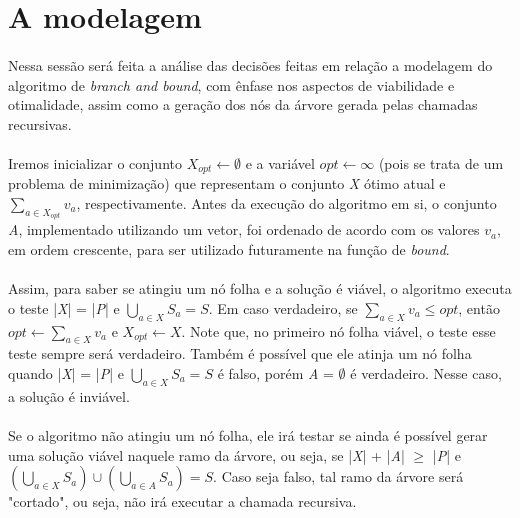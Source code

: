 \documentclass{article}
\begin{document}
\section{A modelagem}

\paragraph{} Nessa sessão será feita a análise das decisões feitas em relação a modelagem do algoritmo de \emph{branch and bound}, com ênfase nos aspectos de viabilidade e otimalidade, assim como a geração dos nós da árvore gerada pelas chamadas recursivas.

\paragraph{} Iremos inicializar o conjunto \emph{$X_{opt} \leftarrow \emptyset$} e a variável \emph{$opt \leftarrow \infty$} (pois se trata de um problema de minimização) que representam o conjunto \emph{X} ótimo atual e \emph{$\sum_{a \in X_{opt}} v_a$}, respectivamente. Antes da execução do algoritmo em si, o conjunto \emph{A}, implementado utilizando um vetor, foi ordenado de acordo com os valores \emph{$v_a$}, em ordem crescente, para ser utilizado futuramente na função de \emph{bound}.

\paragraph{} Assim, para saber se atingiu um nó folha e a solução é viável, o algoritmo executa o teste |\emph{X}| = |\emph{P}| e \emph{$\bigcup_{a \in X} S_a = S$}. Em caso verdadeiro, se \emph{$\sum_{a \in X} v_a \leq opt$}, então \emph{$opt \leftarrow \sum_{a \in X} v_a$} e \emph{$X_{opt} \leftarrow X$}. Note que, no primeiro nó folha viável, o teste esse teste sempre será verdadeiro. Também é possível que ele atinja um nó folha quando |\emph{X}| = |\emph{P}| e \emph{$\bigcup_{a \in X} S_a = S$} é falso, porém \emph{A} = $\emptyset$ é verdadeiro. Nesse caso, a solução é inviável.

\paragraph{} Se o algoritmo não atingiu um nó folha, ele irá testar se ainda é possível gerar uma solução viável naquele ramo da árvore, ou seja, se |\emph{X}| + |\emph{A}| $\geq$ |\emph{P}| e \emph{$(\bigcup_{a \in X} S_a) \cup (\bigcup_{a \in A} S_a) = S$}. Caso seja falso, tal ramo da árvore será "cortado", ou seja, não irá executar a chamada recursiva.
\end{document}
